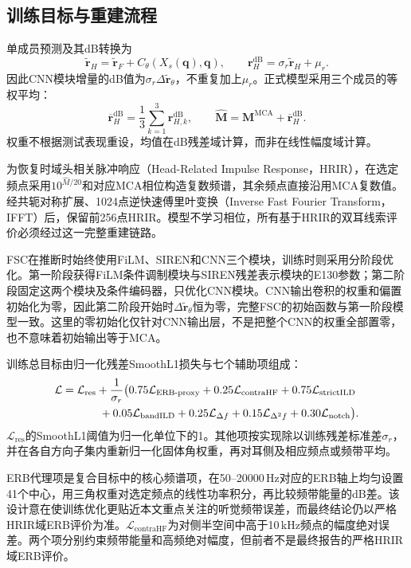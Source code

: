 \documentclass[UTF8,a4paper]{article}
\begin{document}
\subsection{训练目标与重建流程}
单成员预测及其dB转换为
\begin{equation}
\widetilde{\mathbf r}_H=\widetilde{\mathbf r}_F+
C_\theta(X_s(\mathbf q),\mathbf q),\qquad
\mathbf r_H^{\mathrm{dB}}=\sigma_r\widetilde{\mathbf r}_H+\mu_r.
\end{equation}
因此CNN模块增量的dB值为$\sigma_r\Delta\widetilde{\mathbf r}_\theta$，不重复加上$\mu_r$。正式模型采用三个成员的等权平均：
\begin{equation}
\overline{\mathbf r}_H^{\mathrm{dB}}=\frac{1}{3}
\sum_{k=1}^{3}\mathbf r_{H,k}^{\mathrm{dB}},\qquad
\widehat{\mathbf M}=\mathbf M^{\mathrm{MCA}}+
\overline{\mathbf r}_H^{\mathrm{dB}}.
\label{eq:ensemble}
\end{equation}
权重不根据测试表现重设，均值在dB残差域计算，而非在线性幅度域计算。

为恢复时域头相关脉冲响应（Head-Related Impulse Response，HRIR），在选定频点采用$10^{\widehat M/20}$和对应MCA相位构造复数频谱，其余频点直接沿用MCA复数值。经共轭对称扩展、1024点逆快速傅里叶变换（Inverse Fast Fourier Transform，IFFT）后，保留前256点HRIR。模型不学习相位，所有基于HRIR的双耳线索评价必须经过这一完整重建链路。

FSC在推断时始终使用FiLM、SIREN和CNN三个模块，训练时则采用分阶段优化。第一阶段获得FiLM条件调制模块与SIREN残差表示模块的E130参数；第二阶段固定这两个模块及条件编码器，只优化CNN模块。CNN输出卷积的权重和偏置初始化为零，因此第二阶段开始时$\Delta\widetilde{\mathbf r}_\theta$恒为零，完整FSC的初始函数与第一阶段模型一致。这里的零初始化仅针对CNN输出层，不是把整个CNN的权重全部置零，也不意味着初始输出等于MCA。

训练总目标由归一化残差SmoothL1损失与七个辅助项组成：
\begin{align}
\mathcal L={}&\mathcal L_{\mathrm{res}}+
\frac{1}{\sigma_r}\big(
0.75\mathcal L_{\mathrm{ERB\text{-}proxy}}+
0.25\mathcal L_{\mathrm{contraHF}}+
0.75\mathcal L_{\mathrm{strictILD}}\notag\\
&\qquad+
0.05\mathcal L_{\mathrm{bandILD}}+
0.25\mathcal L_{\Delta f}+
0.15\mathcal L_{\Delta^2 f}+
0.30\mathcal L_{\mathrm{notch}}\big).
\label{eq:training-loss}
\end{align}
$\mathcal L_{\mathrm{res}}$的SmoothL1阈值为归一化单位下的1。其他项按实现除以训练残差标准差$\sigma_r$，并在各自方向子集内重新归一化固体角权重，再对耳侧及相应频点或频带平均。

ERB代理项是复合目标中的核心频谱项，在50--20000\,Hz对应的ERB轴上均匀设置41个中心，用三角权重对选定频点的线性功率积分，再比较频带能量的dB差。该设计意在使训练优化更贴近本文重点关注的听觉频带误差，而最终结论仍以严格HRIR域ERB评价为准。$\mathcal L_{\mathrm{contraHF}}$为对侧半空间中高于10\,kHz频点的幅度绝对误差。两个项分别约束频带能量和高频绝对幅度，但前者不是最终报告的严格HRIR域ERB评价。
\end{document}
